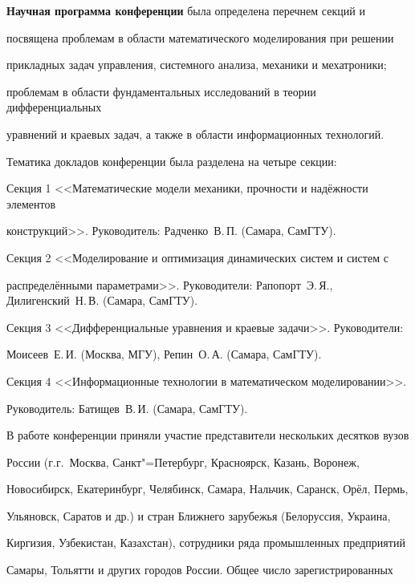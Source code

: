 \smallskip



\textbf{Научная программа конференции} была определена перечнем секций и 

посвящена проблемам в области математического моделирования при решении 

прикладных задач управления, системного анализа, механики и мехатроники; 

проблемам в области фундаментальных исследований в теории дифференциальных 

уравнений и краевых задач, а также в области информационных технологий.



Тематика докладов конференции была разделена на четыре секции:



Секция 1 <<Математические модели механики, прочности и надёжности элементов 

конструкций>>. Руководитель: Радченко~В.\,П. (Самара, \mbox{СамГТУ}).



Секция 2 <<Моделирование и оптимизация динамических систем и систем с~

распределёнными параметрами>>. Руководители: Рапопорт~Э.\,Я., Дилигенский~Н.\,В. (Самара, \mbox{СамГТУ}).



Секция 3 <<Дифференциальные уравнения и краевые задачи>>. Руководители: 

Моисеев~Е.\,И. (Моск\-ва, МГУ), Репин~О.\,А. (Самара, \mbox{СамГТУ}).



Секция 4 <<Информационные технологии в математическом моделировании>>. 

Руководитель: Батищев~В.\,И. (Самара, \mbox{СамГТУ}).



В работе конференции приняли участие представители нескольких десятков вузов 

России \linebreak (г.г.~Москва, Санкт"=Петербург, Красноярск, Казань, Воронеж, 

Новосибирск, Екатеринбург, Челябинск, Самара, Нальчик, Саранск, Орёл, Пермь, 

Ульяновск, Саратов и др.) и стран Ближнего зарубежья (Белоруссия, Украина, 

Киргизия, Узбекистан, Казахстан), сотрудники ряда промышленных предприятий 

Самары, Тольятти и других городов России. Общее число зарегистрированных 


